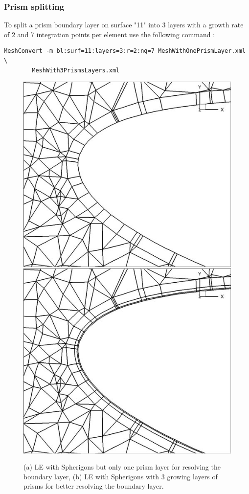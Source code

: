 \subsubsection{Prism splitting}
To split a prism boundary layer on surface "11" into 3 layers with a growth rate of 2 and 7 integration points per element use the following command :
\begin{lstlisting}[style=BashInputStyle]
MeshConvert -m bl:surf=11:layers=3:r=2:nq=7 MeshWithOnePrismLayer.xml \
        MeshWith3PrismsLayers.xml
\end{lstlisting}
\begin{figure}[!htbp]
\begin{center}
\includegraphics[width = 0.47 \textwidth]{Figures/SphnoBL.jpg}
\includegraphics[width = 0.47 \textwidth]{Figures/SphBL.jpg}
\caption{(a) LE with Spherigons but only one prism layer for resolving the boundary layer, (b)  LE with Spherigons with 3 growing layers of prisms for better resolving the boundary layer.}
\label{fig:}
\end{center}
\end{figure}


